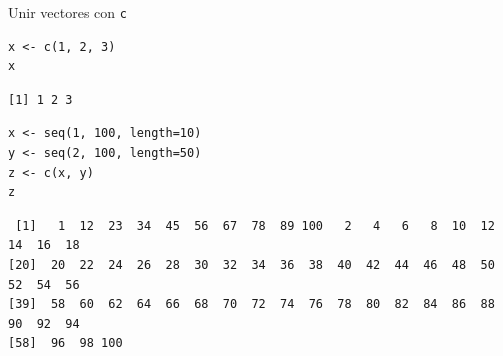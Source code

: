 \documentclass[xcolor={usenames,svgnames,dvipsnames}]{beamer}
\begin{document}
\begin{frame}[fragile,label=sec-2-1-3]{Unir vectores con \texttt{c}}
 \lstset{language=R,label= ,caption= ,numbers=none}
\begin{lstlisting}
x <- c(1, 2, 3)
x
\end{lstlisting}

\begin{verbatim}
[1] 1 2 3
\end{verbatim}

\lstset{language=R,label= ,caption= ,numbers=none}
\begin{lstlisting}
x <- seq(1, 100, length=10)
y <- seq(2, 100, length=50)
z <- c(x, y)
z
\end{lstlisting}

\begin{verbatim}
 [1]   1  12  23  34  45  56  67  78  89 100   2   4   6   8  10  12  14  16  18
[20]  20  22  24  26  28  30  32  34  36  38  40  42  44  46  48  50  52  54  56
[39]  58  60  62  64  66  68  70  72  74  76  78  80  82  84  86  88  90  92  94
[58]  96  98 100
\end{verbatim}
\end{frame}
\end{document}
